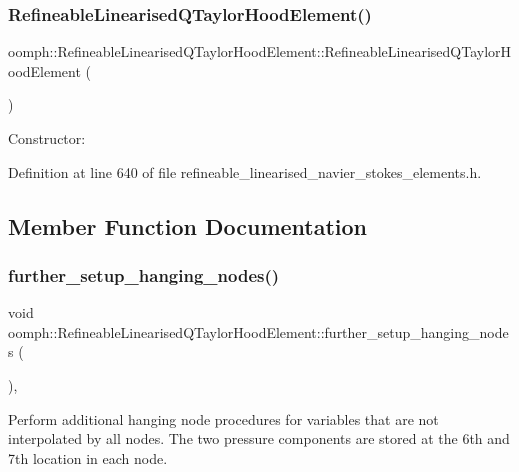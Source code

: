 \subsubsection{\texorpdfstring{Refineable\+Linearised\+Q\+Taylor\+Hood\+Element()}{RefineableLinearisedQTaylorHoodElement()}}
{\footnotesize\ttfamily oomph\+::\+Refineable\+Linearised\+Q\+Taylor\+Hood\+Element\+::\+Refineable\+Linearised\+Q\+Taylor\+Hood\+Element (\begin{DoxyParamCaption}{ }\end{DoxyParamCaption})\hspace{0.3cm}{\ttfamily [inline]}}



Constructor\+: 



Definition at line 640 of file refineable\+\_\+linearised\+\_\+navier\+\_\+stokes\+\_\+elements.\+h.



\subsection{Member Function Documentation}
\mbox{\label{classoomph_1_1RefineableLinearisedQTaylorHoodElement_a744e9dabce8e94de320d9baa362786af}} 
\subsubsection{\texorpdfstring{further\+\_\+setup\+\_\+hanging\+\_\+nodes()}{further\_setup\_hanging\_nodes()}}
{\footnotesize\ttfamily void oomph\+::\+Refineable\+Linearised\+Q\+Taylor\+Hood\+Element\+::further\+\_\+setup\+\_\+hanging\+\_\+nodes (\begin{DoxyParamCaption}{ }\end{DoxyParamCaption})\hspace{0.3cm}{\ttfamily [inline]}, {\ttfamily [virtual]}}



Perform additional hanging node procedures for variables that are not interpolated by all nodes. The two pressure components are stored at the 6th and 7th location in each node. 



